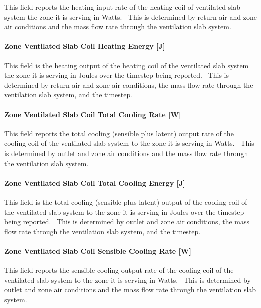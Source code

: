 This field reports the heating input rate of the heating coil of ventilated slab system the zone it is serving in Watts.~ This is determined by return air and zone air conditions and the mass flow rate through the ventilation slab system.

\paragraph{Zone Ventilated Slab Coil Heating Energy {[}J{]}}\label{zone-ventilated-slab-coil-heating-energy-j}

This field is the heating output of the heating coil of the ventilated slab system the zone it is serving in Joules over the timestep being reported.~ This is determined by return air and zone air conditions, the mass flow rate through the ventilation slab system, and the timestep.

\paragraph{Zone Ventilated Slab Coil Total Cooling Rate {[}W{]}}\label{zone-ventilated-slab-coil-total-cooling-rate-w}

This field reports the total cooling (sensible plus latent) output rate of the cooling coil of the ventilated slab system to the zone it is serving in Watts.~ This is determined by outlet and zone air conditions and the mass flow rate through the ventilation slab system.

\paragraph{Zone Ventilated Slab Coil Total Cooling Energy {[}J{]}}\label{zone-ventilated-slab-coil-total-cooling-energy-j}

This field is the total cooling (sensible plus latent) output of the cooling coil of the ventilated slab system to the zone it is serving in Joules over the timestep being reported.~ This is determined by outlet and zone air conditions, the mass flow rate through the ventilation slab system, and the timestep.

\paragraph{Zone Ventilated Slab Coil Sensible Cooling Rate {[}W{]}}\label{zone-ventilated-slab-coil-sensible-cooling-rate-w}

This field reports the sensible cooling output rate of the cooling coil of the ventilated slab system to the zone it is serving in Watts.~ This is determined by outlet and zone air conditions and the mass flow rate through the ventilation slab system.

